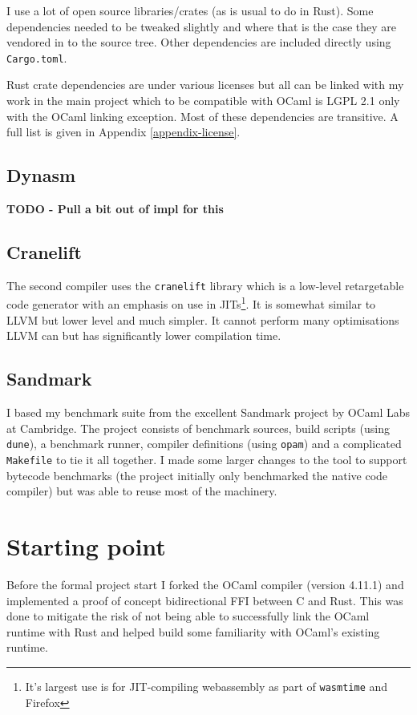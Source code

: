 I use a lot of open source libraries/crates (as is usual to do in Rust). Some dependencies needed
to be tweaked slightly and where that is the case they are vendored in to the source tree. Other
dependencies are included directly using \texttt{Cargo.toml}.

Rust crate dependencies are under various licenses but all can be linked with my work in the main
project which to be compatible with OCaml is LGPL 2.1 only with the OCaml linking exception. Most
of
these dependencies are transitive. A full list is given in Appendix \ref{appendix-license}.

\subsection{Dynasm}

\textbf{TODO - Pull a bit out of impl for this}

\subsection{Cranelift}

The second compiler uses the \texttt{cranelift} \cite{cranelift} library which is a low-level
retargetable code generator with an emphasis on use in JITs\footnote{It's largest use is for
    JIT-compiling webassembly as part of \texttt{wasmtime} and Firefox}. It is somewhat similar to
LLVM
but lower level and much simpler. It cannot perform many optimisations LLVM can but has
significantly lower compilation time.

\subsection{Sandmark}

I based my benchmark suite from the excellent Sandmark project by OCaml Labs at Cambridge. The
project consists of benchmark sources, build scripts (using \texttt{dune}), a benchmark runner,
compiler definitions (using \texttt{opam}) and a complicated \texttt{Makefile} to tie it all
together.  I made some larger changes to the tool to support bytecode benchmarks (the project
initially only benchmarked the native code compiler) but was able to reuse most of the machinery.

\section{Starting point}

Before the formal project start I forked the OCaml compiler (version 4.11.1) and implemented a
proof of concept bidirectional FFI between C and Rust. This was done to mitigate the risk of not
being able to successfully link the OCaml runtime with Rust and helped build some familiarity with
OCaml's existing runtime.

